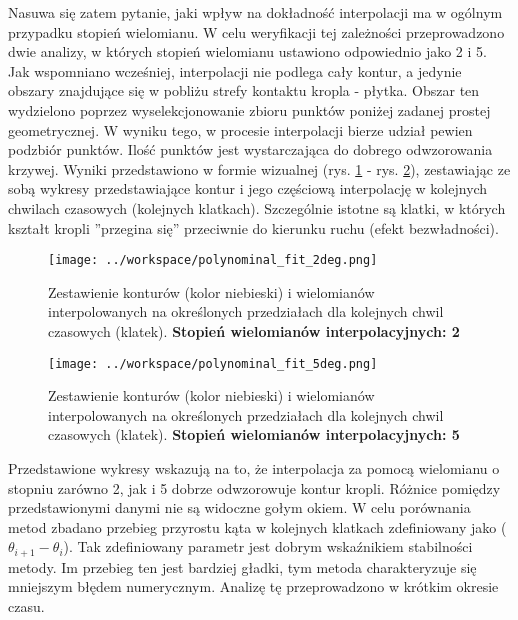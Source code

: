 \documentclass[a4paper,11pt,twoside,openright]{article} %
\begin{document}
\noindent Nasuwa się zatem pytanie, jaki wpływ na dokładność interpolacji ma w ogólnym przypadku stopień wielomianu. W celu weryfikacji tej zależności przeprowadzono dwie analizy, w których stopień wielomianu ustawiono odpowiednio jako 2 i 5. Jak wspomniano wcześniej, interpolacji nie podlega cały kontur, a jedynie obszary znajdujące się w pobliżu strefy kontaktu kropla - płytka. Obszar ten wydzielono poprzez wyselekcjonowanie zbioru punktów poniżej zadanej prostej geometrycznej. W wyniku tego, w procesie interpolacji bierze udział pewien podzbiór punktów. Ilość punktów jest wystarczająca do dobrego odwzorowania krzywej. Wyniki przedstawiono w formie wizualnej (rys. \ref{fig:polynomial_fit_2deg} - rys. \ref{fig:polynomial_fit_5deg}), zestawiając ze sobą wykresy przedstawiające kontur i jego częściową interpolację w kolejnych chwilach czasowych (kolejnych klatkach). Szczególnie istotne są klatki, w których kształt kropli ''przegina się'' przeciwnie do kierunku ruchu (efekt bezwładności). 

\captionsetup{skip=0pt}
\begin{figure}[!h]
\captionsetup{justification=centering}
\begin{center}
\texttt{[image: ../workspace/polynominal\_fit\_2deg.png]} 
\end{center}
\caption{Zestawienie konturów (kolor niebieski) i wielomianów interpolowanych na określonych przedziałach dla kolejnych chwil czasowych (klatek). \textbf{Stopień wielomianów interpolacyjnych: 2}}
\label{fig:polynomial_fit_2deg}
\end{figure} 
\newpage


\captionsetup{skip=0pt}
\begin{figure}[!h]
\captionsetup{justification=centering}
\begin{center}
\texttt{[image: ../workspace/polynominal\_fit\_5deg.png]} 
\end{center}
\caption{Zestawienie konturów (kolor niebieski) i wielomianów interpolowanych na określonych przedziałach dla kolejnych chwil czasowych (klatek). \textbf{Stopień wielomianów interpolacyjnych: 5}}
\label{fig:polynomial_fit_5deg}
\end{figure} 

\noindent Przedstawione wykresy wskazują na to, że interpolacja za pomocą wielomianu o stopniu zarówno 2, jak i 5 dobrze odwzorowuje kontur kropli. Różnice pomiędzy przedstawionymi danymi nie są widoczne gołym okiem. W celu porównania metod zbadano przebieg przyrostu kąta w kolejnych klatkach zdefiniowany jako ($\theta_{i+1} - \theta_{i}$). Tak zdefiniowany parametr jest dobrym wskaźnikiem stabilności metody. Im przebieg ten jest bardziej gładki, tym metoda charakteryzuje się mniejszym błędem numerycznym. Analizę tę przeprowadzono w krótkim okresie czasu.
\end{document}
